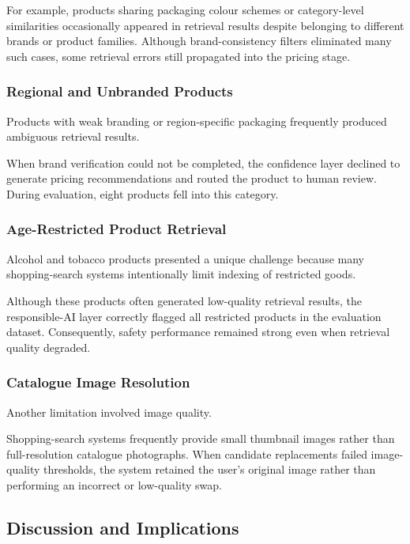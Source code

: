 \documentclass[conference]{IEEEtran}
\begin{document}
For example, products sharing packaging colour schemes or category-level
similarities occasionally appeared in retrieval results despite belonging to
different brands or product families.
Although brand-consistency filters eliminated many such cases, some retrieval
errors still propagated into the pricing stage. 

\subsubsection{Regional and Unbranded Products}

Products with weak branding or region-specific packaging frequently produced
ambiguous retrieval results.

When brand verification could not be completed,
the confidence layer declined to generate pricing recommendations and routed
the product to human review.
During evaluation, eight products fell into this category. 

\subsubsection{Age-Restricted Product Retrieval}

Alcohol and tobacco products presented a unique challenge because many
shopping-search systems intentionally limit indexing of restricted goods.

Although these products often generated low-quality retrieval results,
the responsible-AI layer correctly flagged all restricted products in the
evaluation dataset.
Consequently, safety performance remained strong even when retrieval quality
degraded. 

\subsubsection{Catalogue Image Resolution}

Another limitation involved image quality.

Shopping-search systems frequently provide small thumbnail images rather than
full-resolution catalogue photographs.
When candidate replacements failed image-quality thresholds,
the system retained the user's original image rather than performing an
incorrect or low-quality swap. 

\subsection{Discussion and Implications}
\end{document}
